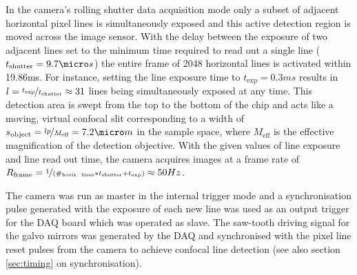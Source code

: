 \documentclass[12pt]{spieman}  %
\begin{document}
In the camera's rolling shutter data acquisition mode only a subset of adjacent horizontal pixel lines is simultaneously exposed and this active detection region is moved across the image sensor\cite{Baumgart2012}. With the delay between the exposure of two adjacent lines set to the minimum time required to read out a single line ($t_{\text{shutter}}=9.7\micro s$) the entire frame of 2048 horizontal lines is activated within 19.86ms. For instance, setting the line exposure time to $t_{\text{exp}}=0.3ms$ results in $l=\nicefrac{t_{\text{exp}}}{t_{\text{shutter}}}\approx31$  lines being simultaneously exposed at any time. This detection area is swept from the top to the bottom of the chip and acts like a moving, virtual confocal slit corresponding to a width of $s_{\text{object}}=\nicefrac{l p}{M_{\text{eff}}}= 7.2 \micro m $ in the sample space, where $M_{\text{eff}}$ is the effective magnification of the detection objective. With the given values of line exposure and line read out time, the camera acquires images at a frame rate of  $R_{\text{frame}} = \nicefrac{1}{(\#_{\text{horiz. lines}}*t_{\text{shutter}}+t_{\text{exp}})} \approx 50Hz$. 

The camera was run as master in the internal trigger mode and a synchronisation pulse generated with the exposure of each new line was used as an output trigger for the DAQ board which was operated as slave. The saw-tooth driving signal for the galvo mirrors was generated by the DAQ and synchronised with the pixel line reset pulses from the camera to achieve confocal line detection\cite{Baumgart2012} (see also section \ref{sec:timing} on synchronisation). %
 
\end{document}
